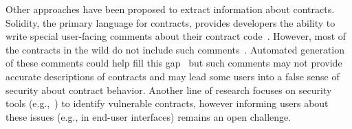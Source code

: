 \documentclass[conference]{IEEEtran}
\begin{document}


Other approaches have been proposed to extract information about contracts.
Solidity, the primary language for contracts, provides developers the ability to write special user-facing comments about their contract code~\cite{solidityNatspec}.
However, most of the contracts in the wild do not include such comments~\cite{hu2021automating}.
Automated generation of these comments could help fill this gap~\cite{hu2021automating} but such comments may not provide accurate descriptions of contracts and may lead some users into a false sense of security about contract behavior.
Another line of research focuses on security tools (e.g.,~\cite{kalra2018zeus,tsankov2018security}) to identify vulnerable contracts, however informing users about these issues (e.g., in end-user interfaces) remains an open challenge.
\end{document}
